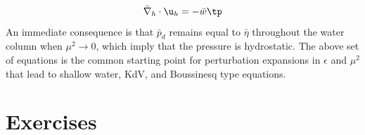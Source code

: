 \documentclass[graybox,envcountchap,sectrefs,final]{svmonodo}
\begin{document}
\begin{equation}
\label{scale:surfacewave:kinbott3}
\bar\nabla_h\cdot\u_h =-\bar w\tp
\end{equation}
An immediate consequence is that $\bar p_d$ remains equal to $\bar \eta$ throughout the water column when $\mu^2\rightarrow 0$, which imply that the pressure
is hydrostatic. The above set of equations is the common  starting point for
perturbation expansions in $\epsilon$ and $\mu^2$ that lead to shallow water,
KdV, and Boussinesq type equations.



\section{Exercises}
\end{document}
